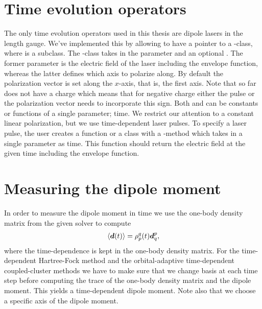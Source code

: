     \section{Time evolution operators}
        The only time evolution operators used in this thesis are dipole lasers
        in the length gauge.
        We've implemented this by allowing  to have a
        pointer to a -class, where 
        is a subclass.
        The -class takes in the parameter 
        and an optional .
        The former parameter is the electric field of the laser including the
        envelope function, whereas the latter defines which axis to polarize
        along.
        By default the polarization vector is set along the $x$-axis, that is,
        the first axis.
        Note that  so far does not have a charge which means
        that for negative charge either the pulse or the polarization vector
        needs to incorporate this sign.
        Both  and  can be constants
        or functions of a single parameter; time.
        We restrict our attention to a constant linear polarization, but we use
        time-dependent laser pulses.
        To specify a laser pulse, the user creates a function or a class with a
        -method which takes in a single parameter as time.
        This function should return the electric field at the given time
        including the envelope function.

    \section{Measuring the dipole moment}
        In order to measure the dipole moment in time we use the one-body
        density matrix from the given solver to compute
        \begin{align}
            \expval*{\boldsymbol{d}(t)}
            = \rho^{q}_{p}(t)\boldsymbol{d}^{p}_{q},
        \end{align}
        where the time-dependence is kept in the one-body density matrix.
        For the time-dependent Hartree-Fock method and the orbital-adaptive
        time-dependent coupled-cluster methods we have to make sure that we
        change basis at each time step before computing the trace of the
        one-body density matrix and the dipole moment.
        This yields a time-dependent dipole moment.
        Note also that we choose a specific axis of the dipole moment.

\clearemptydoublepage
